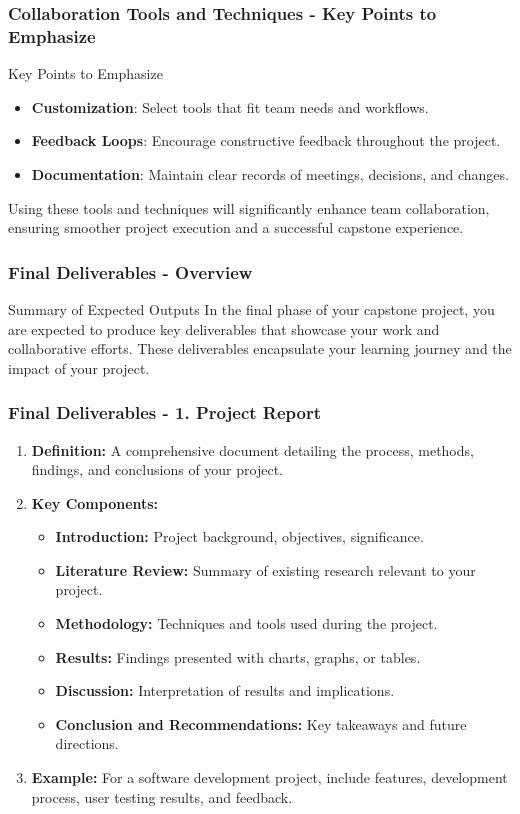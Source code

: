 \documentclass[aspectratio=169]{beamer}
\begin{document}
\begin{frame}[fragile]
    \frametitle{Collaboration Tools and Techniques - Key Points to Emphasize}
    \begin{block}{Key Points to Emphasize}
        \begin{itemize}
            \item \textbf{Customization}: Select tools that fit team needs and workflows.
            \item \textbf{Feedback Loops}: Encourage constructive feedback throughout the project.
            \item \textbf{Documentation}: Maintain clear records of meetings, decisions, and changes.
        \end{itemize}
    \end{block}
    Using these tools and techniques will significantly enhance team collaboration, ensuring smoother project execution and a successful capstone experience.
\end{frame}

\begin{frame}[fragile]
    \frametitle{Final Deliverables - Overview}
    \begin{block}{Summary of Expected Outputs}
        In the final phase of your capstone project, you are expected to produce key deliverables that showcase your work and collaborative efforts. These deliverables encapsulate your learning journey and the impact of your project.
    \end{block}
\end{frame}

\begin{frame}[fragile]
    \frametitle{Final Deliverables - 1. Project Report}
    \begin{enumerate}
        \item \textbf{Definition:} A comprehensive document detailing the process, methods, findings, and conclusions of your project.
        \item \textbf{Key Components:}
        \begin{itemize}
            \item \textbf{Introduction:} Project background, objectives, significance.
            \item \textbf{Literature Review:} Summary of existing research relevant to your project.
            \item \textbf{Methodology:} Techniques and tools used during the project.
            \item \textbf{Results:} Findings presented with charts, graphs, or tables.
            \item \textbf{Discussion:} Interpretation of results and implications.
            \item \textbf{Conclusion and Recommendations:} Key takeaways and future directions.
        \end{itemize}
        \item \textbf{Example:} For a software development project, include features, development process, user testing results, and feedback.
    \end{enumerate}
\end{frame}
\end{document}
